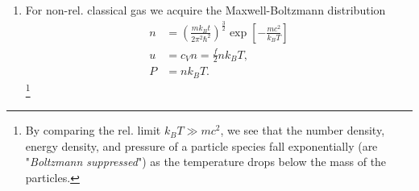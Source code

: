 \begin{enumerate}
	\begin{equation}
		n = \sum_\alpha N_\alpha = \int \md N = \int g \frac{V}{(2\pi)^3} \md^3 p = \int \frac{\md^3 p}{(2 \pi)^3} \frac{g}{e^{\frac{\epsilon(p)}{k_B T} }\pm 1},
	\end{equation}
	with $g$ being the statistical weight, i.e. $g_\gamma=2$ for photons and otherwise $g=2s+1$ for spin-$s$ particles, and with 
	\begin{equation}
		\epsilon(p) = \left\{\begin{array}{ll}
		cp & \text{ultra-rel. gas} \\
		\sqrt{c^2 p^2+m^2c^4} & \text{rel. gas} \\
		\frac{p^2}{2m} & \text{non-rel. gas} \\
		\end{array}		\right\}.
	\end{equation}
	Thus, the mean energy density in thermal equilibrium is
	\begin{equation}
	U = \int \pmeasure \frac{g \epsilon(p)}{e^{\frac{\epsilon(p)}{k_B T}} \pm 1 }.
	\end{equation}
\footnote{$1eV=1.6\times 10^{-12}erg$, i.e. $k_B T = 1.16\times 10^4 K$.}
	\begin{mybox}{Ultra-rel. boson in thermal equilibrium}
		\begin{align}
			N_B &= g_B \frac{\zeta(3)}{\pi^3} \left(\frac{k_B T}{\hbar c}\right)^3 \quad \propto T^3\\
			U_B &= g_B \frac{\pi^2}{30} \frac{(k_B T)^4}{(\hbar c)^3}\quad \propto T^4\\
			P_B &= \frac{1}{3} U \quad \propto T^4\\
			S_B &= g_B k_B \frac{2 \pi^2}{45} \left(\frac{k_B T}{\hbar c}\right)^3 \quad \propto T^3.
		\end{align}
	\end{mybox}
\begin{mybox}{Ultra-rel. fermions in thermal equilibrium}
	\begin{align}
		n_F &= \frac{g_F}{g_B} n_B=\frac{3}{4} n_B \quad \propto T^3\\
		u_F &= \frac{7}{8} u_B \quad \propto T^4\\
		P_F &= \frac{g_F}{g_B} P_B=\frac{7}{8} P_B \quad \propto T^4 \\
		S_F &= \frac{3}{4} S_B \quad \propto T^3.
	\end{align}
\end{mybox}
\item For non-rel. classical gas we acquire the Maxwell-Boltzmann distribution
\begin{align}
n&= \left(\frac{m k_B t}{2 \pi^2 \hbar^2}\right)^\frac{3}{2} \exp\left[-\frac{mc^2}{k_B T}\right]\\
u&=c_V n = \frac{f}{2} n k_B T,\\
P&= nk_B T.
\end{align}\footnote{By comparing the rel. limit $k_B T \gg mc^2$, we see that the number density, energy density, and pressure of a particle species fall exponentially (are "\emph{Boltzmann suppressed}") as the temperature drops below the mass of the particles.}
\end{enumerate}
